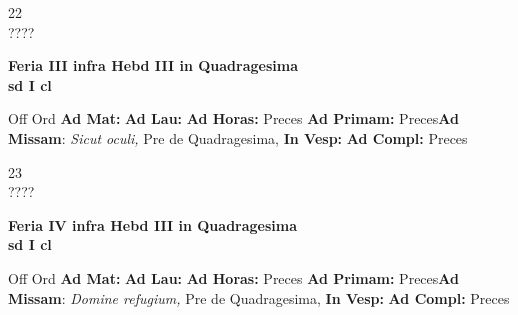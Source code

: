\documentclass[10pt, openany]{book}
\begin{document}
    \begin{center}
        \begin{minipage}{3.5in}
            \vspace{2em}
            \begin{minipage}{0.5in}
                {\Huge 22} \\
                {\normalsize ????}
            \end{minipage}
            \begin{minipage}{3.0in}
                \textbf{ \large Feria III infra Hebd III in Quadragesima \\
                \textnormal{\normalsize sd I cl}}

            \end{minipage}
            \begin{justify}Off Ord
                \textbf{Ad Mat: }
                \textbf{Ad Lau: }
                \textbf{Ad Horas: }Preces
                \textbf{Ad Primam: }Preces\textbf{Ad Missam}: \textit{Sicut oculi,} Pre de Quadragesima, 
                \textbf{In Vesp: }
                \textbf{Ad Compl: }Preces
            \end{justify}
        \end{minipage}
    \end{center}

    \begin{center}
        \begin{minipage}{3.5in}
            \vspace{2em}
            \begin{minipage}{0.5in}
                {\Huge 23} \\
                {\normalsize ????}
            \end{minipage}
            \begin{minipage}{3.0in}
                \textbf{ \large Feria IV infra Hebd III in Quadragesima \\
                \textnormal{\normalsize sd I cl}}

            \end{minipage}
            \begin{justify}Off Ord
                \textbf{Ad Mat: }
                \textbf{Ad Lau: }
                \textbf{Ad Horas: }Preces
                \textbf{Ad Primam: }Preces\textbf{Ad Missam}: \textit{Domine refugium,} Pre de Quadragesima, 
                \textbf{In Vesp: }
                \textbf{Ad Compl: }Preces
            \end{justify}
        \end{minipage}
    \end{center}
\end{document}
